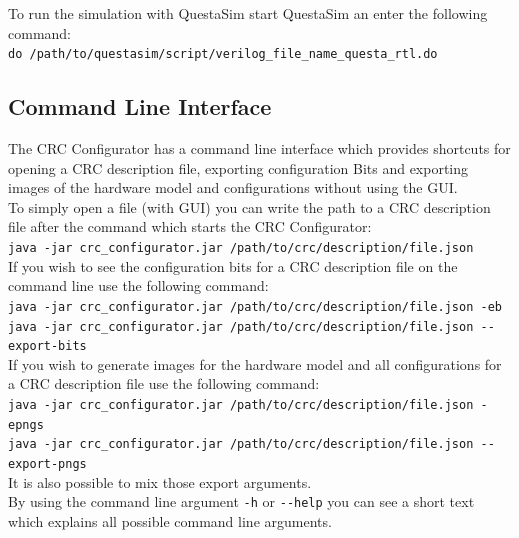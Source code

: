 \documentclass{article}
\begin{document}
To run the simulation with QuestaSim start QuestaSim an enter the following command:\\

\noindent\texttt{do /path/to/questasim/script/verilog\_file\_name\_questa\_rtl.do}

\subsection*{Command Line Interface}
The CRC Configurator has a command line interface which provides shortcuts for opening a CRC description file, exporting configuration Bits and exporting images of the hardware model and configurations without using the GUI.\\
To simply open a file (with GUI) you can write the path to a CRC description file after the command which starts the CRC Configurator:
\\

\noindent\texttt{java -jar crc\_configurator.jar /path/to/crc/description/file.json}\\

If you wish to see the configuration bits for a CRC description file on the command line use the following command:\\

\noindent\texttt{java -jar crc\_configurator.jar /path/to/crc/description/file.json -eb}\\
\noindent\texttt{java -jar crc\_configurator.jar /path/to/crc/description/file.json -{}-export-bits}\\

If you wish to generate images for the hardware model and all configurations for a CRC description file use the following command:\\

\noindent\texttt{java -jar crc\_configurator.jar /path/to/crc/description/file.json -epngs}\\
\noindent\texttt{java -jar crc\_configurator.jar /path/to/crc/description/file.json -{}-export-pngs}\\

It is also possible to mix those export arguments.\\
By using the command line argument \texttt{-h} or \texttt{-{}-help} you can see a short text which explains all possible command line arguments.
\end{document}
